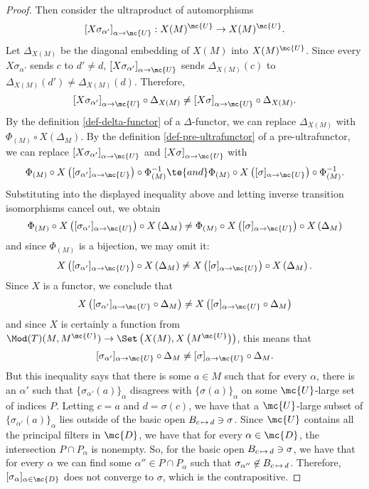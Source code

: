 \begin{proof}
Then consider the ultraproduct of automorphisms $$\left[X \sigma_{\alpha'}\right]_{\alpha \to \mc{U}} : X(M)^{\mc{U}} \to X(M)^{\mc{U}}.$$ Let $\Delta_{X(M)}$ be the diagonal embedding of $X(M)$ into $X(M)^{\mc{U}}$. Since every $X \sigma_{\alpha'}$ sends $c$ to $d' \neq d$, $\left[X \sigma_{\alpha'} \right]_{\alpha \to \mc{U}}$ sends $\Delta_{X(M)}(c)$ to $\Delta_{X(M)}(d') \neq \Delta_{X(M)}(d)$. Therefore,
$$
\left[X \sigma_{\alpha'}\right]_{\alpha \to \mc{U}} \circ \Delta_{X(M)} \neq \left[X \sigma \right]_{\alpha \to \mc{U}} \circ \Delta_{X(M)}.
$$
By the definition \ref{def-delta-functor} of a $\Delta$-functor, we can replace $\Delta_{X(M)}$ with $\Phi_{(M)} \circ X \left(\Delta_M\right)$. By the definition \ref{def-pre-ultrafunctor} of a pre-ultrafunctor, we can replace $\left[X \sigma_{\alpha'} \right]_{\alpha \to \mc{U}}$ and $\left[X \sigma \right]_{\alpha \to \mc{U}}$ with $$\Phi_{(M)} \circ X\left([\sigma_{\alpha'}]_{\alpha \to \mc{U}}\right) \circ \Phi_{(M)}^{-1} \te{ and } \Phi_{(M)} \circ X\left([\sigma]_{\alpha \to \mc{U}}\right) \circ \Phi_{(M)}^{-1}.$$ Substituting into the displayed inequality above and letting inverse transition isomorphisms cancel out, we obtain
$$
  \Phi_{(M)} \circ X\left([\sigma_{\alpha'}]_{\alpha \to \mc{U}}\right) \circ X \left(\Delta_M\right) \neq \Phi_{(M)} \circ X\left([\sigma]_{\alpha \to \mc{U}}\right) \circ  X \left(\Delta_M\right)
$$
and since $\Phi_{(M)}$ is a bijection, we may omit it:
$$
X\left([\sigma_{\alpha'}]_{\alpha \to \mc{U}}\right) \circ X \left(\Delta_M\right) \neq  X\left([\sigma]_{\alpha \to \mc{U}}\right) \circ  X \left(\Delta_M\right).
$$
Since $X$ is a functor, we conclude that
$$
X\left([\sigma_{\alpha'}]_{\alpha \to \mc{U}} \circ \Delta_M\right) \neq  X\left([\sigma]_{\alpha \to \mc{U}} \circ\Delta_M\right)
$$
and since $X$ is certainly a function from $\Mod(T)(M, M^{\mc{U}}) \to \Set\left(X(M), X\left(M^{\mc{U}}\right)\right)$, this means that
$$
[\sigma_{\alpha'}]_{\alpha \to \mc{U}} \circ \Delta_M \neq [\sigma]_{\alpha \to \mc{U}} \circ\Delta_M.
$$
But this inequality says that there is some $a \in M$ such that for every $\alpha$, there is an $\alpha'$ such that $\{\sigma_{\alpha'}(a)\}_{\alpha}$ disagrees with $\{\sigma(a)\}_{\alpha}$ on some $\mc{U}$-large set of indices $P$. Letting $c = a$ and $d = \sigma(c)$, we have that a $\mc{U}$-large subset of $\{\sigma_{\alpha'}(a)\}_{\alpha}$ lies outside of the basic open $B_{c \hspace{0.5mm} \mapsto \hspace{0.5mm} d} \ni \sigma$. Since $\mc{U}$ contains all the principal filters in $\mc{D}$, we have that for every $\alpha \in \mc{D}$, the intersection $P \cap P_{\alpha}$ is nonempty. So, for the basic open $B_{c \hspace{0.5mm} \mapsto \hspace{0.5mm} d} \ni \sigma$, we have that for every $\alpha$ we can find some $\alpha'' \in P \cap P_{\alpha}$ such that $\sigma_{\alpha''} \not \in B_{c \hspace{0.5mm} \mapsto \hspace{0.5mm} d}$. Therefore, $[\sigma_{\alpha}]_{\alpha \in \mc{D}}$ does not converge to $\sigma$, which is the contrapositive.
\end{proof}

